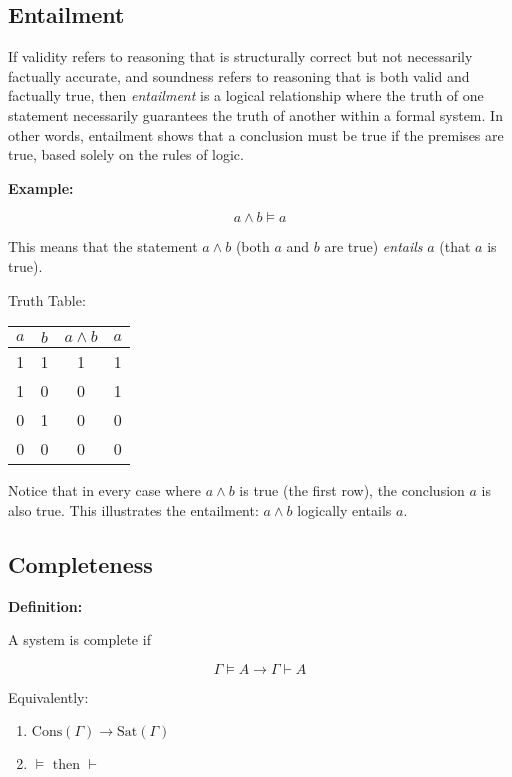 \documentclass[12pt,a4paper,openany]{article}
\begin{document}
\subsection{Entailment}\label{entailment}

If validity refers to reasoning that is structurally correct but not
necessarily factually accurate, and soundness refers to reasoning that
is both valid and factually true, then \emph{entailment} is a logical
relationship where the truth of one statement necessarily guarantees the
truth of another within a formal system. In other words, entailment
shows that a conclusion must be true if the premises are true, based
solely on the rules of logic.

\textbf{Example:} 

\[ a \land b \models a \]

This means that the statement \(a \land b\) (both \(a\) and \(b\) are
true) \emph{entails} \(a\) (that \(a\) is true).

Truth Table:

\begin{center}
\begin{tabular}{|c|c|c|c|}
\hline
\(a\) & \(b\) & \(a \land b\) & \(a\) \\
\hline
1 & 1 & 1 & 1 \\
1 & 0 & 0 & 1 \\
0 & 1 & 0 & 0 \\
0 & 0 & 0 & 0 \\
\hline
\end{tabular}
\end{center}

Notice that in every case where \(a \land b\) is true (the first row),
the conclusion \(a\) is also true. This illustrates the entailment:
\(a \land b\) logically entails \(a\).

\subsection{Completeness}\label{completeness}

\textbf{Definition:}

A system is complete if

\[
\Gamma \models A \to \Gamma \vdash A
\]

Equivalently:

\begin{enumerate}
\item \(\text{Cons}(\Gamma) \to \text{Sat}(\Gamma)\)
\item \(\models \text{ then } \vdash\)
\end{enumerate}
\end{document}
